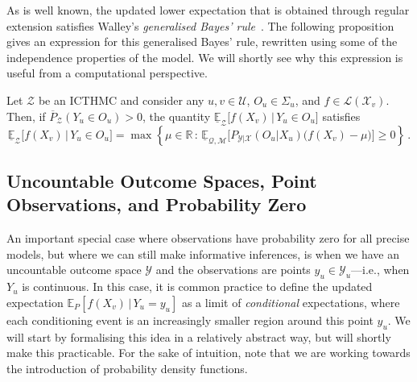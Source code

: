 \documentclass[twoside,11pt]{article}
\newcommand{\reals}{\mathbb{R}}
\newcommand{\states}{\mathcal{X}}
\newcommand{\observs}{\mathcal{Y}}
\newcommand{\lexp}{\underline{\mathbb{E}}_{\rateset,\mathcal{M}}}
\newcommand{\gambles}{\mathcal{L}}
\newcommand{\rateset}{\mathcal{Q}}
\begin{document}
As is well known, the updated lower expectation that is obtained through regular extension satisfies Walley's \emph{generalised Bayes' rule}~\citep{Walley:1991vk}. The following proposition gives an expression for this generalised Bayes' rule, rewritten using some of the independence properties of the model. We will shortly see why this expression is useful from a computational perspective.
\begin{proposition}\label{prop:GBR_regular}
Let $\mathcal{Z}$ be an ICTHMC and consider any $u,v\in\mathcal{U}$, $O_u\in\Sigma_u$, and $f\in\gambles(\states_v)$. Then, if $\overline{P}_\mathcal{Z}(Y_u\in O_u) > 0$, the quantity $\underline{\mathbb{E}}_{\mathcal{Z}}\bigl[f(X_v)\,\vert\,Y_u\in O_u\bigr]$ satisfies
\begin{equation*}
\underline{\mathbb{E}}_{\mathcal{Z}}\bigl[f(X_v)\,\vert\,Y_u\in O_u\bigr] = \max\left\{\mu\in\reals\,:\, \lexp\bigl[P_{\observs\vert\states}(O_u\vert X_u)\bigl(f(X_v) - \mu\bigr)\bigr] \geq 0\right\}\,.
\end{equation*}
\end{proposition}

\subsection{Uncountable Outcome Spaces, Point Observations, and Probability Zero}\label{subsec:uncountable}

An important special case where observations have probability zero for all precise models, but where we can still make informative inferences, is when we have an uncountable outcome space $\observs$ and the observations are points $y_u\in\observs_u$---i.e., when $Y_u$ is continuous. In this case, it is common practice to define the updated expectation $\mathbb{E}_P[f(X_v)\,\vert\,Y_u=y_u]$ as a limit of \emph{conditional} expectations, where each conditioning event is an increasingly smaller region around this point $y_u$. We will start by formalising this idea in a relatively abstract way, but will shortly make this practicable. For the sake of intuition, note that we are working towards the introduction of probability density functions.
\end{document}
